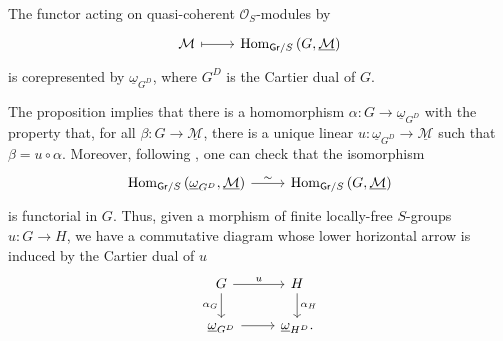 \begin{prop}\label{prop:ReprhM}
	The functor acting on quasi-coherent $\mathcal{O}_{ S }$-modules by
	\begin{equation*}
	\begin{tikzcd}[row sep = 0ex
		,/tikz/column 1/.append style={anchor=base east}
		,/tikz/column 2/.append style={anchor=base west}]
		\mathcal{M} \arrow[r, "", mapsto] & 
		\Hom_{ \mathsf{Gr}/S } \left( G, \underline{\mathcal{M}} \right)
	\end{tikzcd}
	\end{equation*} 
	is corepresented by $\underline{\omega}_{G^D}$, where $G^D$ is
	the Cartier dual of $G$.
\end{prop}


\begin{rem}[]\label{rem:ReprMorExt}
	The proposition implies that there is
	a homomorphism $\alpha\colon G \to \underline{\omega}_{G^D}$
	with the property that, for all $\beta\colon G \to \underline{\mathcal{M}}$,
	there is a unique linear $u\colon \underline{\omega}_{G^D} \to \underline{\mathcal{M}}$
	such that $\beta = u \circ \alpha$.
	Moreover, following {\cite[Chapter IV, remark 1.6]{Messing}},
	one can check that the isomorphism
	\begin{equation*}
	\begin{tikzcd}[row sep = 0ex
		,/tikz/column 1/.append style={anchor=base east}
		,/tikz/column 2/.append style={anchor=base west}]
		\Hom_{\mathsf{Gr}/S} \left( \underline{\omega}_{G^D}, \underline{\mathcal{M}} \right)
		\arrow[r, "\sim", rightarrow] &
		\Hom_{\mathsf{Gr}/S} \left( G, \underline{\mathcal{M}} \right)
	\end{tikzcd}
	\end{equation*} 
	is functorial in $G$.
	Thus, given a morphism of finite locally-free $S$-groups $u\colon G \to H$,
	we have a commutative diagram whose lower horizontal arrow is
	induced by the Cartier dual of $u$
	\begin{equation}\label{diag:functorialityRepresent}
	\begin{tikzcd}
		G \arrow[r, "u", rightarrow] 
		\arrow[d, "\alpha_G"', rightarrow] &
		H \arrow[d, "\alpha_H", rightarrow] \\
		\underline{\omega}_{G^D} \arrow[r, "", rightarrow] &
		\underline{\omega}_{H^D}
	.\end{tikzcd}
	\end{equation}
\end{rem}


